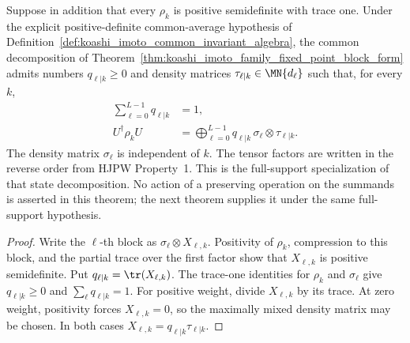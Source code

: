 \begin{theorem}
    \label{thm:koashi_imoto_normalized_family_block_form}
    \leanok
    Suppose in addition that every $\rho_k$ is positive semidefinite with
    trace one. Under the explicit positive-definite common-average hypothesis
    of Definition~\ref{def:koashi_imoto_common_invariant_algebra}, the common
    decomposition of
    Theorem~\ref{thm:koashi_imoto_family_fixed_point_block_form} admits
    numbers $q_{\ell|k}\geq 0$ and density matrices
    $\tau_{\ell|k}\in\MN{d_\ell}$ such that, for every $k$,
    \begin{align}
        \sum_{\ell=0}^{L-1}q_{\ell|k}&=1,
        \label{eq:koashi_imoto_family_weights}\\
        U^\dagger\rho_kU
        &=
        \bigoplus_{\ell=0}^{L-1}
        q_{\ell|k}\,\sigma_\ell\otimes\tau_{\ell|k}.
        \label{eq:koashi_imoto_normalized_family_block_form}
    \end{align}
    The density matrix $\sigma_\ell$ is independent of $k$. The tensor factors
    are written in the reverse order from HJPW Property~1. This is the
    full-support specialization of that state decomposition. No action of a
    preserving operation on the summands is asserted in this theorem; the next
    theorem supplies it under the same full-support hypothesis.
\end{theorem}

\begin{proof}
    \leanok
    Write the $\ell$-th block as
    $\sigma_\ell\otimes X_{\ell,k}$. Positivity of $\rho_k$, compression to
    this block, and the partial trace over the first factor show that
    $X_{\ell,k}$ is positive semidefinite. Put
    $q_{\ell|k}=\tr(X_{\ell,k})$. The trace-one identities for $\rho_k$ and
    $\sigma_\ell$ give
    $q_{\ell|k}\geq 0$ and
    $\sum_\ell q_{\ell|k}=1$. For positive weight, divide
    $X_{\ell,k}$ by its trace. At zero weight, positivity forces
    $X_{\ell,k}=0$, so the maximally mixed density matrix may be chosen.
    In both cases
    $X_{\ell,k}=q_{\ell|k}\tau_{\ell|k}$.
\end{proof}

